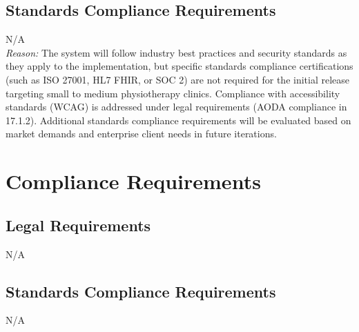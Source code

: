 \documentclass[12pt]{article}
\begin{document}
\subsection{Standards Compliance Requirements}
\noindent N/A \\
\textit{Reason:} The system will follow industry best practices and security standards as they apply to the implementation, but specific standards compliance certifications (such as ISO 27001, HL7 FHIR, or SOC 2) are not required for the initial release targeting small to medium physiotherapy clinics. Compliance with accessibility standards (WCAG) is addressed under legal requirements (AODA compliance in 17.1.2). Additional standards compliance requirements will be evaluated based on market demands and enterprise client needs in future iterations.

\section{Compliance Requirements}
\subsection{Legal Requirements}
N/A

\subsection{Standards Compliance Requirements}
N/A
\end{document}
